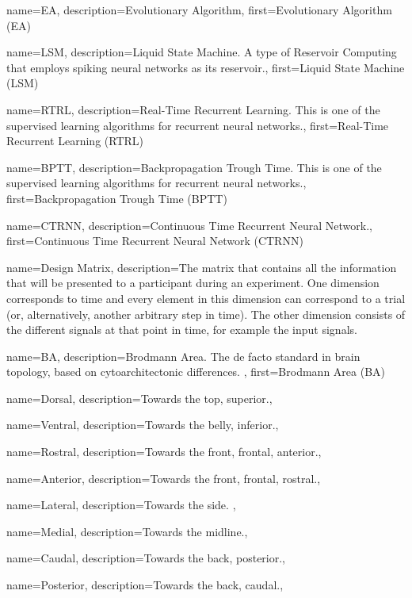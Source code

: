 {
  name=EA,
  description={Evolutionary Algorithm},
  first={Evolutionary Algorithm (EA)}
}

{
  name=LSM,
  description={Liquid State Machine. A type of Reservoir Computing that employs spiking neural networks as its reservoir.},
  first={Liquid State Machine (LSM)}
}

{
  name=RTRL,
  description={Real-Time Recurrent Learning. This is one of the supervised learning algorithms for recurrent neural networks.},
  first={Real-Time Recurrent Learning (RTRL)}
}

{
  name=BPTT,
  description={Backpropagation Trough Time. This is one of the supervised learning algorithms for recurrent neural networks.},
  first={Backpropagation Trough Time (BPTT)}
}

{
  name=CTRNN,
  description={Continuous Time Recurrent Neural Network.},
  first={Continuous Time Recurrent Neural Network (CTRNN)}
}

{
  name={Design Matrix},
  description={The matrix that contains all the information that will be presented to a participant during an experiment. One dimension corresponds to time and every element in this dimension can correspond to a trial (or, alternatively, another arbitrary step in time). The other dimension consists of the different signals at that point in time, for example the input signals.}  
}

{
  name={BA},
  description={Brodmann Area. The de facto standard in brain topology, based on cytoarchitectonic differences. },
  first={Brodmann Area (BA)}
}

{
  name={Dorsal},
  description={Towards the top, superior.}, 
}

{
  name={Ventral},
  description={Towards the belly, inferior.},
}

{
  name={Rostral},
  description={Towards the front, frontal, anterior.},
}

{
  name={Anterior},
  description={Towards the front, frontal, rostral.},
}

{
  name={Lateral},
  description={Towards the side. },
}

{
  name={Medial},
  description={Towards the midline.},
}

{
  name={Caudal},
  description={Towards the back, posterior.},
}

{
  name={Posterior},
  description={Towards the back, caudal.},
}

\renewcommand*{\glspostdescription}{} %
\renewcommand{\glossarysection}[2][]{} %
\renewcommand{\glsgroupskip}{} %
\setlength{\glsdescwidth}{0.83\linewidth} %
\makeglossaries

